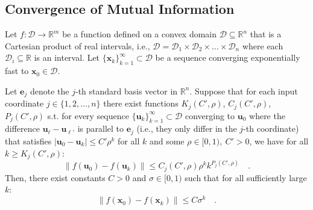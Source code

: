 \documentclass[../../main.tex]{subfiles}
\begin{document}
\pagebreak
\subsection{Convergence of Mutual Information}
\begin{theorem}
    \label{theorem:element-wise_exponential_convergence_implies_exponential_convergence}
Let $f: \mathcal{D} \to \mathbb{R}^m$ be a function defined on a convex domain $\mathcal{D} \subseteq \mathbb{R}^n$ that is a Cartesian product of real intervals, i.e., $\mathcal{D} = \mathcal{D}_1 \times \mathcal{D}_2 \times \dots \times \mathcal{D}_n$ where each $\mathcal{D}_i \subseteq \mathbb{R}$ is an interval. Let $\{\bm{x}_k\}_{k=1}^\infty \subset \mathcal{D}$ be a sequence converging exponentially fast to $\bm{x}_0 \in \mathcal{D}$.

Let $\bm{e}_j$ denote the $j$-th standard basis vector in $\mathbb{R}^n$. Suppose that for each input coordinate $j \in \{1, 2, \dots, n\}$ there exist functions $K_j(C', \rho)$, $C_j(C', \rho)$, $P_j(C', \rho)$ s.t. for every sequence $\{\bm{u}_k\}_{k=1}^\infty \subset \mathcal{D}$ converging to $\bm{u}_0$ where the difference $\bm{u}_\ell-\bm{u}_{\ell'}$ is parallel to $\bm{e}_j$ (i.e., they only differ in the $j$-th coordinate) that satisfies $|\bm{u}_0 - \bm{u}_k| \leq C' \rho^k$ for all $k$ and some $\rho \in [0, 1), \ C' > 0$, we have for all $k \geq K_j(C', \rho)$:
\[
    \|f(\bm{u}_0) - f(\bm{u}_k)\| \le C_j(C', \rho) \rho^k k^{P_j(C', \rho)} \quad .
\]
Then, there exist constants $C > 0$ and $\sigma \in [0, 1)$ such that for all sufficiently large $k$:
\[
    \|f(\bm{x}_0) - f(\bm{x}_k)\| \le C \sigma^k \quad .
\]
\end{theorem}
\end{document}
